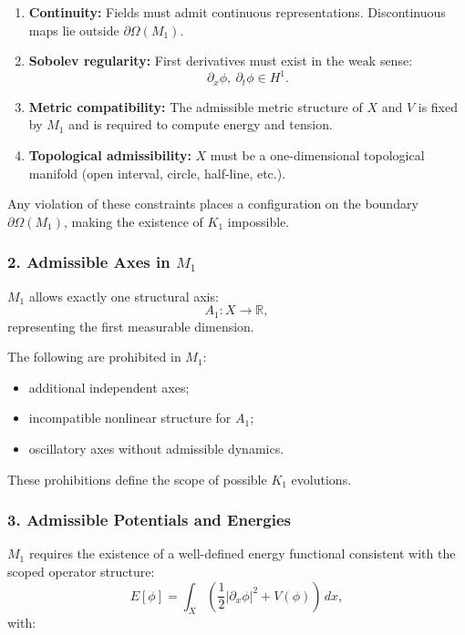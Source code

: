 \begin{enumerate}
    \item \textbf{Continuity:}
    Fields must admit continuous representations. Discontinuous maps lie outside $\partial\Omega(M_1)$.

    \item \textbf{Sobolev regularity:}
    First derivatives must exist in the weak sense:
    \[
    \partial_x \phi,\ \partial_t \phi \in H^1.
    \]

    \item \textbf{Metric compatibility:}
    The admissible metric structure of $X$ and $V$ is fixed by $M_1$ and is required to compute energy and tension.

    \item \textbf{Topological admissibility:}
    $X$ must be a one-dimensional topological manifold
    (open interval, circle, half-line, etc.).
\end{enumerate}

Any violation of these constraints places a configuration on the boundary
$\partial\Omega(M_1)$, making the existence of $K_1$ impossible.

\subsubsection*{2. Admissible Axes in \texorpdfstring{$M_1$}{M_1}}

$M_1$ allows exactly one structural axis:
\[
A_1 : X \to \mathbb{R},
\]
representing the first measurable dimension.

The following are prohibited in $M_1$:

\begin{itemize}
    \item additional independent axes;
    \item incompatible nonlinear structure for $A_1$;
    \item oscillatory axes without admissible dynamics.
\end{itemize}

These prohibitions define the scope of possible $K_1$ evolutions.

\subsubsection*{3. Admissible Potentials and Energies}

$M_1$ requires the existence of a well-defined energy functional
consistent with the scoped operator structure:
\[
E[\phi] = \int_X \left(
\frac{1}{2} |\partial_x \phi|^2 + V(\phi)
\right)\,dx,
\]
with:

